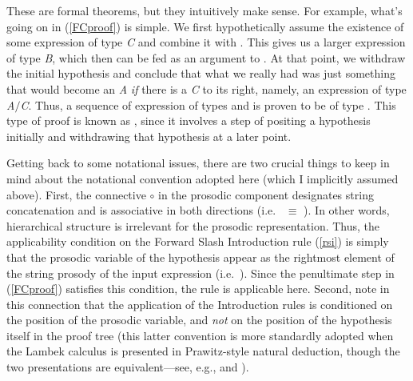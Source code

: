 \documentclass[output=paper]{langsci/langscibook}
\begin{document}
\noindent
These are formal theorems, but they intuitively make sense.
For example, what's going on in  (\ref{FCproof}) is simple. We first
hypothetically assume the existence of some expression of type
\textit{C} and combine it with . This gives us a larger expression
of type \textit{B}, which then can be fed as an argument to  .
At that point, we withdraw the initial hypothesis and conclude that
what we really had was just something that would become an \textit{A} \emph{if}
there is a \textit{C} to its right, namely, an expression of type \textit{A}\ensuremath{/}\textit{C}.
Thus, a sequence of expression of types  and 
is proven to be of type .  This type of proof
is known as , since it involves a step of
positing a hypothesis initially and withdrawing that hypothesis
at a later point.

Getting back to some notational issues, there are two crucial things
to keep in mind about the notational 
convention adopted here (which I implicitly assumed above). First, the
connective \ensuremath{\circ}\xspace in the prosodic component designates string
concatenation and is associative in both directions
(i.e.\  \pt{ (\ensuremath{\greekp_1} \ensuremath{\circ}\xspace \ensuremath{\greekp_2}) \ensuremath{\circ}\xspace \ensuremath{\greekp_3}} \ensuremath{ \equiv\xspace } \pt{ \ensuremath{\greekp_1} \ensuremath{\circ}\xspace (\ensuremath{\greekp_2} \ensuremath{\circ}\xspace \ensuremath{\greekp_3}) }). In other words, hierarchical
structure is irrelevant for the prosodic representation. Thus,
the applicability condition on the Forward Slash
Introduction rule (\ref{rsi}) is simply that
the prosodic variable \pt{ \ensuremath{\greekp} }
of the hypothesis appear as the rightmost element of the
string prosody of the input expression (i.e.\
\pt{\ptv{b} \ensuremath{\circ}\xspace \ensuremath{\greekp} }).
Since the penultimate step in (\ref{FCproof}) satisfies this 
condition, the rule is applicable here. Second, note in this
connection that the application of the
Introduction rules is conditioned on the position of the prosodic
variable, and \emph{not} on the position of the hypothesis itself in the
proof tree (this latter convention is more standardly adopted when the
Lambek calculus is presented in Prawitz-style natural deduction,
though the two presentations are
equivalent---see, e.g., \citet{Carpenter98a-u} and \citet{jaeger05}).
\end{document}
